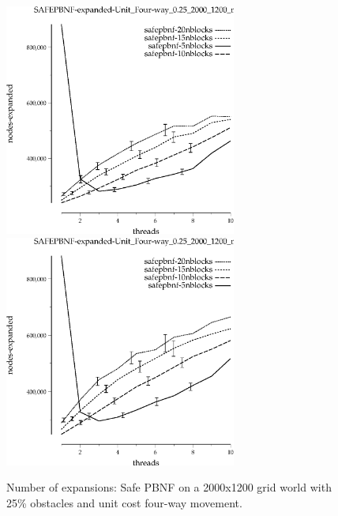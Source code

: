\documentclass{article}
\begin{document}
\begin{figure}[t]
\begin{center}
\includegraphics[width=3in]{grid_unit_four-way_0.25_2000_1200/SAFEPBNF-expanded-Unit_Four-way_0.25_2000_1200_min=60.eps}
\includegraphics[width=3in]{grid_unit_four-way_0.25_2000_1200/SAFEPBNF-expanded-Unit_Four-way_0.25_2000_1200_min=80.eps}
\caption{Number of expansions: Safe PBNF on a 2000x1200 grid world with 25\%
  obstacles and unit cost four-way movement.}
\end{center}
\end{figure}

\end{document}
